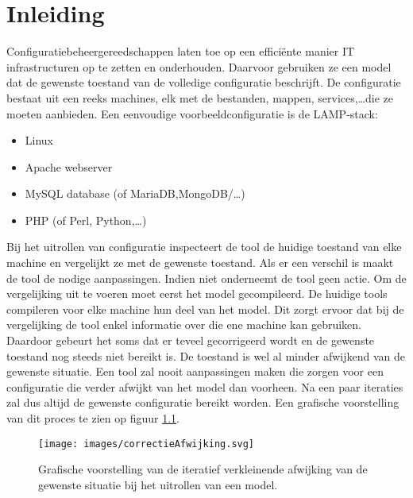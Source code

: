 \chapter{Inleiding}
\label{inleiding}
Configuratiebeheergereedschappen laten toe op een effici\"ente manier IT infrastructuren op te zetten en onderhouden.
Daarvoor gebruiken ze een model dat de gewenste toestand van de volledige configuratie beschrijft.
De configuratie bestaat uit een reeks machines, elk met de bestanden, mappen, services,\ldots die ze moeten aanbieden.
Een eenvoudige voorbeeldconfiguratie is de LAMP-stack: 
\begin{itemize}
  \item Linux
  \item Apache webserver
  \item MySQL database (of MariaDB,MongoDB/\ldots)
  \item PHP (of Perl, Python,\ldots)
\end{itemize}

Bij het uitrollen van configuratie inspecteert de tool de huidige toestand van elke machine en vergelijkt ze met de gewenste
toestand.
Als er een verschil is maakt de tool de nodige aanpassingen. Indien niet onderneemt de tool geen actie.
Om de vergelijking uit te voeren moet eerst het model gecompileerd.
De huidige tools compileren voor elke machine hun deel van het model.
Dit zorgt ervoor dat bij de vergelijking de tool enkel informatie over die ene machine kan gebruiken.
Daardoor gebeurt het soms dat er teveel gecorrigeerd wordt en de gewenste toestand nog steeds niet bereikt is.
De toestand is wel al minder afwijkend van de gewenste situatie.
Een tool zal nooit aanpassingen maken die zorgen voor een configuratie die verder afwijkt van het model dan voorheen.
Na een paar iteraties zal dus altijd de gewenste configuratie bereikt worden.
Een grafische voorstelling van dit proces te zien op figuur \ref{fig:correctieAfwijking}.

\begin{figure}[p]
    \centering
    \texttt{[image: images/correctieAfwijking.svg]}
    \caption{Grafische voorstelling van de iteratief verkleinende afwijking van de gewenste situatie bij het uitrollen van een model.}
    \label{fig:correctieAfwijking}
\end{figure}


